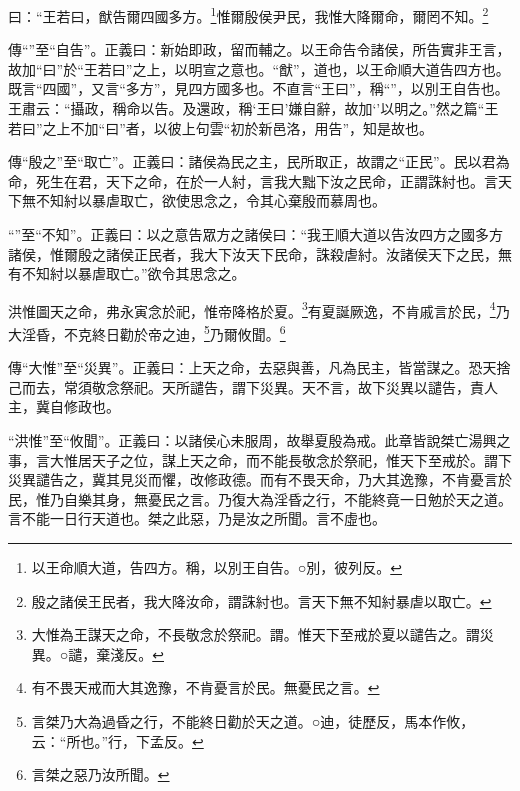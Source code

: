 曰：“王若曰，猷告爾四國多方。\footnote{以王命順大道，告四方。稱，以別王自告。○別，彼列反。}惟爾殷侯尹民，我惟大降爾命，爾罔不知。\footnote{殷之諸侯王民者，我大降汝命，謂誅紂也。言天下無不知紂暴虐以取亡。}


{\noindent\zhuan{}\fzbyks 傳“”至“自告”。正義曰：新始即政，留而輔之。以王命告令諸侯，所告實非王言，故加“曰”於“王若曰”之上，以明宣之意也。“猷”，道也，以王命順大道告四方也。既言“四國”，又言“多方”，見四方國多也。不直言“王曰”，稱“”，以別王自告也。王肅云：“攝政，稱命以告。及還政，稱‘王曰’嫌自辭，故加‘’以明之。”然之篇“王若曰”之上不加“曰”者，以彼上句雲“初於新邑洛，用告”，知是故也。 \par}

{\noindent\zhuan{}\fzbyks 傳“殷之”至“取亡”。正義曰：諸侯為民之主，民所取正，故謂之“正民”。民以君為命，死生在君，天下之命，在於一人紂，言我大黜下汝之民命，正謂誅紂也。言天下無不知紂以暴虐取亡，欲使思念之，令其心棄殷而慕周也。 \par}

{\noindent\shu{}\fzkt “”至“不知”。正義曰：以之意告眾方之諸侯曰：“我王順大道以告汝四方之國多方諸侯，惟爾殷之諸侯正民者，我大下汝天下民命，誅殺虐紂。汝諸侯天下之民，無有不知紂以暴虐取亡。”欲令其思念之。 \par}

洪惟圖天之命，弗永寅念於祀，惟帝降格於夏。\footnote{大惟為王謀天之命，不長敬念於祭祀。謂。惟天下至戒於夏以譴告之。謂災異。○譴，棄淺反。}有夏誕厥逸，不肯戚言於民，\footnote{有不畏天戒而大其逸豫，不肯憂言於民。無憂民之言。}乃大淫昏，不克終日勸於帝之迪，\footnote{言桀乃大為過昏之行，不能終日勸於天之道。○迪，徒歷反，馬本作攸，云：“所也。”行，下孟反。}乃爾攸聞。\footnote{言桀之惡乃汝所聞。}


{\noindent\zhuan{}\fzbyks 傳“大惟”至“災異”。正義曰：上天之命，去惡與善，凡為民主，皆當謀之。恐天捨己而去，常須敬念祭祀。天所譴告，謂下災異。天不言，故下災異以譴告，責人主，冀自修政也。 \par}

{\noindent\shu{}\fzkt “洪惟”至“攸聞”。正義曰：以諸侯心未服周，故舉夏殷為戒。此章皆說桀亡湯興之事，言大惟居天子之位，謀上天之命，而不能長敬念於祭祀，惟天下至戒於。謂下災異譴告之，冀其見災而懼，改修政德。而有不畏天命，乃大其逸豫，不肯憂言於民，惟乃自樂其身，無憂民之言。乃復大為淫昏之行，不能終竟一日勉於天之道。言不能一日行天道也。桀之此惡，乃是汝之所聞。言不虛也。 \par}

